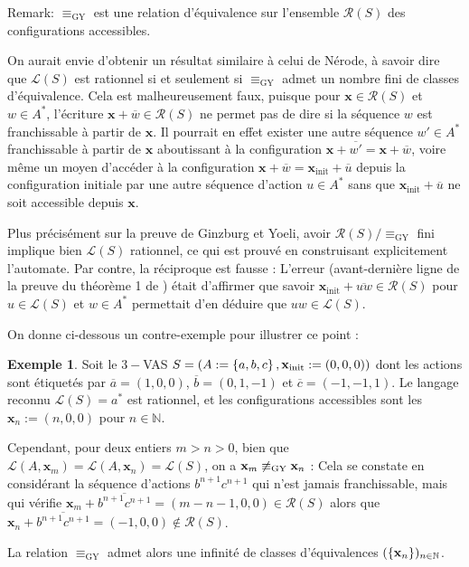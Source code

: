 \documentclass[a4paper,final]{article}
\theoremstyle{definition}
\newtheorem{Example}[Theorem]{Exemple}
\newcommand{\os}[1]{\left\{\mathinner{#1}\right\}}
\newcommand{\N}{\ensuremath{\mathbb{N}}}
\newcommand{\lang}{\ensuremath{\mathcal{L}}}
\newcommand{\conf}{\ensuremath{\mathcal{R}}}
\newcommand{\vect}[1]{\ensuremath{\mathbf{#1}}}
\newcommand{\relGY}{\ensuremath{\equiv_\text{GY}}}
\newcommand{\xinit}{\ensuremath{\vect{x}_\text{init}}}
\newcommand{\valeur}[1]{\ensuremath{\overline{#1}}}
\begin{document}
Remark: $\relGY$ est une relation d'équivalence sur l'ensemble $\conf(S)$ des configurations accessibles.

On aurait envie d'obtenir un résultat similaire à celui de Nérode, à savoir dire que $\lang(S)$ est rationnel si et seulement si $\relGY$ admet un nombre fini de classes d'équivalence.
Cela est malheureusement faux, puisque pour $\vect{x}\in\conf(S)$ et $w\in A^\ast$, l'écriture $\vect{x} +\valeur{w}\in\conf(S)$ ne permet pas de dire si la séquence $w$ est franchissable à partir de $\vect{x}$.
Il pourrait en effet exister une autre séquence $w'\in A^\ast$ franchissable à partir de $\vect{x}$ aboutissant à la configuration $\vect{x} +\valeur{w'} = \vect{x} +\valeur{w}$,
voire même un moyen d'accéder à la configuration $\vect{x} +\valeur{w} = \xinit +\valeur{u}$ depuis la configuration initiale par une autre séquence d'action $u\in A^\ast$ sans que $\xinit +\valeur{u}$ ne soit accessible depuis $\vect{x}$.

Plus précisément sur la preuve de Ginzburg et Yoeli, 
avoir $\conf(S)/\relGY$ fini implique bien $\lang(S)$ rationnel, ce qui est prouvé en construisant explicitement l'automate.
Par contre, la réciproque est fausse : 
L'erreur (avant-dernière ligne de la preuve du théorème 1 de \cite{giyo80}) était d'affirmer que savoir $\xinit +\valeur{uw}\in\conf(S)$ pour $u\in\lang(S)$ et $w\in A^\ast$ permettait d'en déduire que $uw\in\lang(S)$.

On donne ci-dessous un contre-exemple pour illustrer ce point :

\begin{Example}
Soit le $3-$VAS $S = (A:=\os{a,b,c},\xinit:=(0,0,0))$ dont les actions sont étiquetés par $\valeur{a}=(1,0,0)$, $\valeur{b}=(0,1,-1)$ et $\valeur{c}=(-1,-1,1)$.
Le langage reconnu $\lang(S)=a^\ast$ est rationnel, et les configurations accessibles sont les $\vect{x}_n:=(n,0,0)$ pour $n\in\N$.

Cependant, pour deux entiers $m>n>0$, bien que $\lang(A,\vect{x}_m) =\lang(A,\vect{x}_n) =\lang(S)$, on a $\vect{x}_m \not\relGY \vect{x}_n$ :
Cela se constate en considérant la séquence d'actions $b^{n+1}c^{n+1}$ qui n'est jamais franchissable, mais qui vérifie $\vect{x}_m +\valeur{b^{n+1}c^{n+1}} = (m-n-1,0,0)\in \conf(S)$ alors que $\vect{x}_n +\valeur{b^{n+1}c^{n+1}} = (-1,0,0)\notin \conf(S)$.

La relation $\relGY$ admet alors une infinité de classes d'équivalences $(\os{\vect{x}_n})_{n\in\N}$.
\end{Example}
\end{document}
